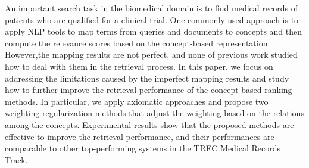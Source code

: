 An important search task in the biomedical domain is to find medical records of patients who are qualified for a clinical trial. One commonly used approach is to apply NLP tools to map terms from queries and documents to concepts and then compute the relevance scores based on the concept-based representation. However,the mapping results are not perfect, and none of previous work studied how to deal with them in the retrieval process. In this paper, we focus on addressing the limitations caused by the imperfect mapping results and study how to further improve the retrieval performance of the concept-based ranking methods. In particular, we apply axiomatic approaches and propose two weighting regularization methods that adjust the weighting based on the relations among the concepts. Experimental results show that the proposed methods are effective to improve the retrieval performance, and their performances are comparable to other top-performing systems in the TREC Medical Records Track.
